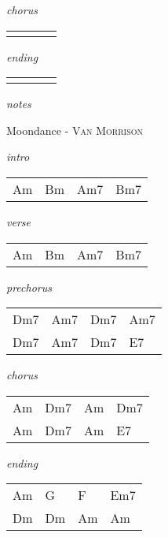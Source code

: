 \documentclass[12pt]{article}
\begin{document}
\textit{chorus}

\begin{tabular}{|P{1.25in}|P{1.25in}|P{1.25in}|P{1.25in}|}
    &   &   &   \\
\end{tabular}

\textit{ending}

\begin{tabular}{|P{1.25in}|P{1.25in}|P{1.25in}|P{1.25in}|}
    &   &   &   \\
\end{tabular}

\textit{notes}

\newpage


{\Huge Moondance} {\huge - \textsc{Van Morrison}}

\huge
\textit{intro}

\begin{tabular}{|P{1.25in}|P{1.25in}|P{1.25in}|P{1.25in}|}
  Am  & Bm  & Am7  & Bm7  \\
\end{tabular}

\textit{verse}

\begin{tabular}{|P{1.25in}|P{1.25in}|P{1.25in}|P{1.25in}|}
  Am  & Bm  & Am7  & Bm7  \\
\end{tabular}

\textit{prechorus}

\begin{tabular}{|P{1.25in}|P{1.25in}|P{1.25in}|P{1.25in}|}
  Dm7  & Am7  &  Dm7 &  Am7 \\
  Dm7  & Am7  &  Dm7 &  E7 \\
\end{tabular}

\textit{chorus}

\begin{tabular}{|P{1.25in}|P{1.25in}|P{1.25in}|P{1.25in}|}
  Am  & Dm7  & Am  & Dm7  \\
  Am  & Dm7  & Am  & E7  \\
\end{tabular}

\textit{ending}

\begin{tabular}{|P{1.25in}|P{1.25in}|P{1.25in}|P{1.25in}|}
  Am  & G  & F  & Em7  \\
  Dm  & Dm  & Am  & Am  \\
\end{tabular}
\end{document}

